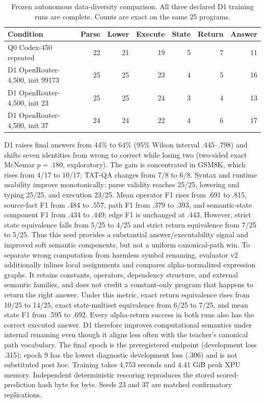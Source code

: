 \documentclass[11pt]{article}
\begin{document}
\begin{table}[t]
\centering\small
\caption{Frozen autonomous data-diversity comparison. All three declared D1
training runs are complete. Counts are exact on the same 25 programs.}
\label{tab:asl-d1-scale}
\begin{tabular}{lrrrrrr}
\toprule
Condition & Parse & Lower & Execute & State & Return & Answer\\
\midrule
Q0 Codex-450 repeated & 22 & 21 & 19 & 5 & 7 & 11\\
D1 OpenRouter-4,500, init 99173 & 25 & 25 & 23 & 4 & 5 & 16\\
D1 OpenRouter-4,500, init 23 & 25 & 25 & 24 & 3 & 4 & 13\\
D1 OpenRouter-4,500, init 37 & 24 & 24 & 22 & 4 & 6 & 17\\
\bottomrule
\end{tabular}
\end{table}

D1 raises final answers from 44\% to 64\% (95\% Wilson interval
.445--.798) and shifts seven identities from wrong to correct while losing two
(two-sided exact McNemar $p=.180$, exploratory). The gain is concentrated in
GSM8K, which rises from 4/17 to 10/17; TAT-QA changes from 7/8 to 6/8. Syntax and
runtime usability improve monotonically: parse validity reaches 25/25,
lowering and typing 25/25, and execution 23/25. Mean operator F1 rises from
.691 to .815, source-fact F1 from .484 to .557, path F1 from .379 to .393, and
semantic-state component F1 from .434 to .449; edge F1 is unchanged at .443.
However, strict state equivalence falls from 5/25 to 4/25 and strict return
equivalence from 7/25 to 5/25. Thus this seed provides a substantial
answer/executability signal and improved soft semantic components, but not a
uniform canonical-path win. To separate wrong computation from harmless symbol
renaming, evaluator v2 additionally inlines local assignments and compares
alpha-normalized expression graphs. It retains constants, operators, dependency
structure, and external semantic families, and does not credit a constant-only
program that happens to return the right answer. Under this metric, exact return
equivalence rises from 10/25 to 14/25, exact state-multiset equivalence from 6/25
to 7/25, and mean state F1 from .595 to .692. Every alpha-return success in both
runs also has the correct executed answer. D1 therefore improves computational
semantics under internal renaming even though it aligns less often with the
teacher's canonical path vocabulary. The final epoch is the preregistered endpoint
(development loss .315); epoch 9 has the lowest diagnostic development loss
(.306) and is not substituted post hoc. Training takes 4,753 seconds and 4.41
GiB peak XPU memory. Independent deterministic rescoring reproduces the stored
scored-prediction hash byte for byte. Seeds 23 and 37 are matched confirmatory
replications.
\end{document}

